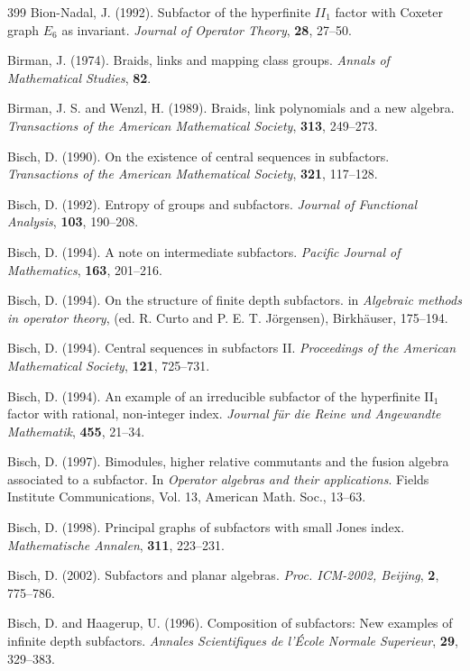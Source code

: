 \documentclass[12pt]{article}
\theoremstyle{plain}
\theoremstyle{definition}
\numberwithin{equation}{section}
\begin{document}
\begin{thebibliography} {399}
Bion-Nadal, J. (1992).
Subfactor of the hyperfinite $II_1$ factor with 
Coxeter graph $E_6$ as invariant.
{\em Journal of Operator Theory}, {\bf 28}, 27--50.

Birman, J. (1974). Braids, links and mapping class groups.
{\em Annals of Mathematical Studies}, {\bf 82}.

Birman, J. S. and Wenzl, H. (1989).
Braids, link polynomials and a new algebra.
{\em Transactions of the American Mathematical Society}, 
{\bf 313}, 249--273.

Bisch, D. (1990). On the existence of central sequences in subfactors.
{\em Transactions of the American Mathematical Society}, 
{\bf 321}, 117--128.

Bisch, D. (1992). Entropy of groups and subfactors.
{\em Journal of Functional Analysis}, {\bf 103}, 
190--208.

Bisch, D. (1994). A note on intermediate subfactors.
{\em Pacific Journal of Mathematics}, {\bf 163}, 
201--216.

Bisch, D. (1994).
On the structure of finite depth subfactors.
in {\em Algebraic methods in operator theory},
(ed. R. Curto and P. E. T. J\"orgensen), 
Birkh\"auser, 175--194.

Bisch, D. (1994).
Central sequences in subfactors II.
{\em Proceedings of the American Mathematical Society},
{\bf 121}, 725--731.

Bisch, D. (1994).
An example of an irreducible subfactor of the hyperfinite
II$_1$ factor with rational, non-integer index.
{\em Journal f\"ur die Reine und Angewandte
Mathematik}, {\bf 455}, 21--34.

Bisch, D. (1997).
Bimodules, higher relative commutants and the fusion algebra
associated to  a subfactor.
In {\em Operator algebras and their applications}.
Fields Institute Communications,
Vol. 13, American Math. Soc., 13--63.

Bisch, D. (1998).
Principal graphs of subfactors with small Jones index.
{\em Mathematische Annalen}, {\bf 311}, 223--231.

Bisch, D. (2002).
Subfactors and planar algebras.
{\em Proc. ICM-2002, Beijing}, {\bf 2},  775--786.

Bisch, D. and Haagerup, U. (1996).
Composition of subfactors: New examples of infinite 
depth subfactors.
{\em Annales Scientifiques de l'\'Ecole Normale 
Superieur}, {\bf 29}, 329--383.


\end{thebibliography}
\end{document}
